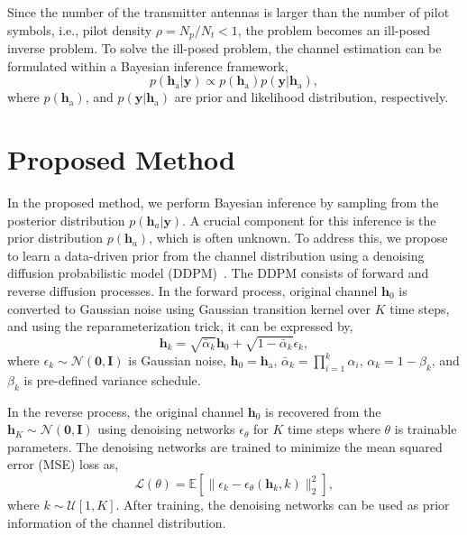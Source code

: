 \documentclass[lettersize,journal]{IEEEtran}
\begin{document}
Since the number of the transmitter antennas is larger than the number of pilot symbols, i.e., pilot density $\rho=N_{p}/N_{t}<1$, the problem becomes an ill-posed inverse problem.
To solve the ill-posed problem, the channel estimation can be formulated within a Bayesian inference framework,
\begin{equation}
  p(\mathbf{h}_{\text{a}}|\mathbf{y})\propto p(\mathbf{h}_{\text{a}})p(\mathbf{y}|\mathbf{h}_{\text{a}}),
\end{equation}
where $p(\mathbf{h}_{\text{a}})$, and $p(\mathbf{y}|\mathbf{h}_{\text{a}})$ are prior and likelihood distribution, respectively.

\section{Proposed Method}

In the proposed method, we perform Bayesian inference by sampling from the posterior distribution $p(\mathbf{h}_{a}|\mathbf{y})$. A crucial component for this inference is the prior distribution $p(\mathbf{h}_{a})$, which is often unknown. To address this, we propose to learn a data-driven prior from the channel distribution using a denoising diffusion probabilistic model (DDPM)~\cite{hoDenoisingDiffusionProbabilistic2020}. The DDPM consists of forward and reverse diffusion processes. In the forward process, original channel $\mathbf{h}_{0}$ is converted to Gaussian noise using Gaussian transition kernel over $K$ time steps, and using the reparameterization trick, it can be expressed by,
\begin{equation}
\mathbf{h}_{k} = \sqrt{ \bar{\alpha}_{k} }\mathbf{h}_{0} + \sqrt{ 1-\bar{\alpha}_{k} }\epsilon_{k},
\end{equation}
where $\epsilon_{k}\sim\mathcal{N}(\mathbf{0},\mathbf{I})$ is Gaussian noise, $\mathbf{h}_{0} = \mathbf{h}_{\text{a}}$, $\bar{\alpha}_{k}=\prod_{i=1}^{k}\alpha_{i}$, $\alpha_{k}=1-\beta_{k}$, and $\beta_{k}$ is pre-defined variance schedule.

In the reverse process, the original channel $\mathbf{h}_{0}$ is recovered from the $\mathbf{h}_{K}\sim\mathcal{N}(\mathbf{0},\mathbf{I})$ using denoising networks $\epsilon_{\theta}$ for $K$ time steps where $\theta$ is trainable parameters. The denoising networks are trained to minimize the mean squared error (MSE) loss as,
\begin{equation}
\mathcal{L}(\theta) = \mathbb{E}[\|\epsilon_{k} - \epsilon_{\theta}(\mathbf{h}_{k},k)\|_{2}^{2}],
\end{equation}
where $k\sim\mathcal{U}[1,K]$. After training, the denoising networks can be used as prior information of the channel distribution.
\end{document}
